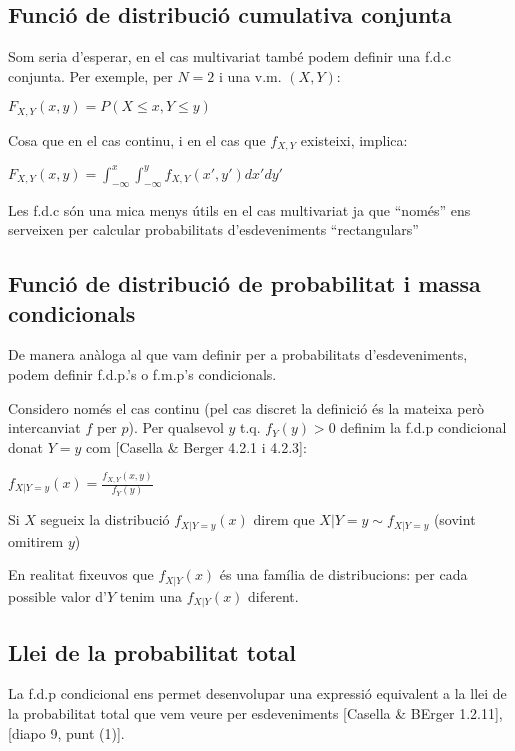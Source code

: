 \documentclass[letterpaper,10pt,english]{sphinxmanual}
\begin{document}
\subsection{Funció de distribució cumulativa conjunta}
\label{\detokenize{0_Intro/0_1_Repas_probabilitat:funcio-de-distribucio-cumulativa-conjunta}}
Som seria d’esperar, en el cas multivariat també podem definir una f.d.c conjunta. Per exemple,
per \(N=2\) i una v.m. \((X, Y)\):

\(F_{X,Y}(x, y) = P(X \leq x, Y \leq y)\)

Cosa que en el cas continu, i en el cas que \(f_{X,Y}\) existeixi, implica:

\(F_{X,Y}(x, y) = \int^x_{-\infty}\int^y_{-\infty} f_{X,Y}(x',y')dx'dy'\)

Les f.d.c són una mica menys útils en el cas multivariat ja que “només” ens serveixen
per calcular probabilitats d’esdeveniments “rectangulars”


\subsection{Funció de distribució de probabilitat i massa condicionals}
\label{\detokenize{0_Intro/0_1_Repas_probabilitat:funcio-de-distribucio-de-probabilitat-i-massa-condicionals}}
De manera anàloga al que vam definir per a probabilitats d’esdeveniments,
podem definir f.d.p.’s o f.m.p’s condicionals.

Considero només el cas continu (pel cas discret la definició
és la mateixa però intercanviat \(f\) per \(p\)). Per qualsevol
\(y\) t.q. \(f_Y(y) > 0\) definim la f.d.p condicional donat
\(Y=y\) com {[}Casella \& Berger 4.2.1 i 4.2.3{]}:

\(f_{X|Y=y}(x) = \frac{f_{X,Y}(x,y)}{f_Y(y)}\)

Si \(X\) segueix la distribució \(f_{X|Y=y}(x)\) direm que
\(X | Y=y \sim f_{X|Y=y}\) (sovint omitirem \(y\))

En realitat fixeu\sphinxhyphen{}vos que \(f_{X|Y}(x)\) és una família de distribucions:
per cada possible valor d’\(Y\) tenim una \(f_{X|Y}(x)\) diferent.


\subsection{Llei de la probabilitat total}
\label{\detokenize{0_Intro/0_1_Repas_probabilitat:llei-de-la-probabilitat-total}}
La f.d.p condicional ens permet desenvolupar una expressió equivalent a
la llei de la probabilitat total que vem veure per esdeveniments {[}Casella \& BErger 1.2.11{]},
{[}diapo 9, punt (1){]}.
\end{document}
